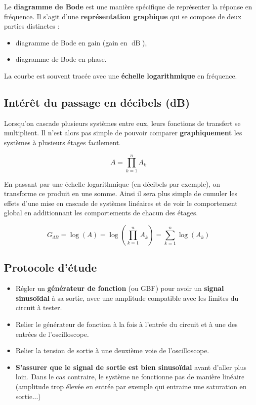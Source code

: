 Le \textbf{diagramme de Bode} est une manière spécifique de représenter la réponse en fréquence. Il s'agit d'une \textbf{représentation graphique} qui se compose de deux parties distinctes :

\begin{itemize}
	\item diagramme de Bode en gain (gain en $\operatorname{dB}$),
	\item diagramme de Bode en phase.
\end{itemize}

\bigskip

La courbe est souvent tracée avec une \textbf{échelle logarithmique} en fréquence. 

\subsection{Intérêt du passage en décibels (dB)}

Lorsqu'on cascade plusieurs systèmes entre eux, leurs fonctions de transfert se multiplient. Il n'est alors pas simple de pouvoir comparer \textbf{graphiquement} les systèmes à plusieurs étages facilement.

$$A = \prod_{k=1}^{n} A_k $$

En passant par une échelle logarithmique (en décibels par exemple), on transforme ce produit en une somme. Ainsi il sera plus simple de cumuler les effets d'une mise en cascade de systèmes linéaires et de voir le comportement global en additionnant les comportements de chacun des étages.

$$G_{dB} = \log(A) = \log(\prod_{k=1}^{n} A_k) = \sum_{k=1}^{n} \log(A_k) $$

\newpage
\subsection{Protocole d'étude}

\begin{itemize}
	\item Régler un \textbf{générateur de fonction} (ou GBF) pour avoir un \textbf{signal sinusoïdal} à sa sortie, avec une amplitude compatible avec les limites du circuit à tester.
	\item Relier le générateur de fonction à la fois à l'entrée du circuit et à une des entrées de l'oscilloscope.
	\item Relier la tension de sortie à une deuxième voie de l'oscilloscope.
	\item \textbf{S'assurer que le signal de sortie est bien sinusoïdal} avant d'aller plus loin. Dans le cas contraire, le système ne fonctionne pas de manière linéaire (amplitude trop élevée en entrée par exemple qui entraine une saturation en sortie...)
\end{itemize}



